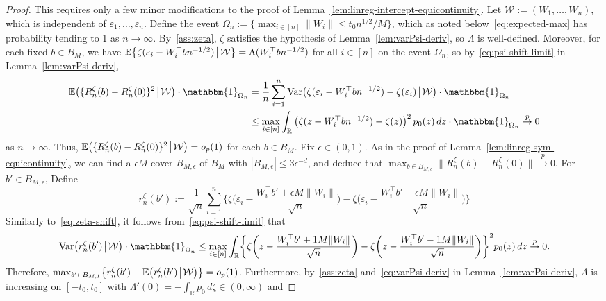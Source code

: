 \documentclass[a4paper]{article}
\newcommand{\R}{\mathbb{R}}
\newcommand{\E}{\mathbb{E}}
\newcommand{\Ind}{\mathbbm{1}}
\newcommand{\norm}[1]{\|{#1}\|}
\newcommand{\cvp}{\overset{p}{\to}}
\DeclareMathOperator\Var{Var}
\theoremstyle{definition}
\begin{document}
\begin{proof}
This requires only a few minor modifications to the proof of Lemma~\ref{lem:linreg-intercept-equicontinuity}. Let $\mathcal{W} := (W_1,\dotsc,W_n)$, which is independent of $\varepsilon_1,\dotsc,\varepsilon_n$. Define the event $\Omega_n := \{\max_{i \in [n]}\norm{W_i} \leq t_0 n^{1/2}/M\}$, which as noted below~\eqref{eq:expected-max} has probability tending to 1 as $n \to \infty$. By~\ref{ass:zeta}, $\zeta$ satisfies the hypothesis of Lemma~\ref{lem:varPsi-deriv}, so $\Lambda$ is well-defined. Moreover, for each fixed $b \in B_M$, we have $\E\bigl\{\zeta(\varepsilon_i - W_i^\top bn^{-1/2})\!\bigm|\!\mathcal{W}\bigr\} = \Lambda(W_i^\top bn^{-1/2})$ for all $i \in [n]$ on the event $\Omega_n$, so by~\eqref{eq:psi-shift-limit} in Lemma~\ref{lem:varPsi-deriv},
\begin{align}
\E\bigl(\{R_n^\zeta(b) - R_n^\zeta(0)\}^2\!\bigm|\!\mathcal{W}\bigr) \cdot \Ind_{\Omega_n} &= \frac{1}{n}\sum_{i=1}^n \Var\bigl(\zeta(\varepsilon_i - W_i^\top bn^{-1/2}) - \zeta(\varepsilon_i)\!\bigm|\!\mathcal{W}\bigr) \cdot \Ind_{\Omega_n} \notag \\
\label{eq:zeta-shift}
&\leq \max_{i \in [n]}\int_\R\,\bigl(\zeta(z - W_i^\top bn^{-1/2}) - \zeta(z)\bigr)^2\,p_0(z)\,dz \cdot \Ind_{\Omega_n} \cvp 0
\end{align}
as $n \to \infty$. Thus, $\E\bigl(\{R_n^\zeta(b) - R_n^\zeta(0)\}^2\!\bigm|\!\mathcal{W}\bigr) = o_p(1)$ for each $b \in B_M$. Fix $\epsilon \in (0,1)$. As in the proof of Lemma~\ref{lem:linreg-sym-equicontinuity}, we can find a $\epsilon M$-cover $B_{M,\epsilon}$ of $B_M$ with $|B_{M,\epsilon}| \leq 3\epsilon^{-d}$, and deduce that $\max_{b \in B_{M,\epsilon}} \norm{R_n^\zeta(b) - R_n^\zeta(0)} \cvp 0$. For $b' \in B_{M,\epsilon}$, Define
\[
r_n^\zeta(b') := \frac{1}{\sqrt{n}} \sum_{i=1}^n \biggl\{\zeta\biggl(\varepsilon_i - \frac{W_i^\top b' + \epsilon M\norm{W_i}}{\sqrt{n}}\biggr) - \zeta\biggl(\varepsilon_i - \frac{W_i^\top b' - \epsilon M\norm{W_i}}{\sqrt{n}}\biggr)\biggr\}
\]
Similarly to~\eqref{eq:zeta-shift}, it follows from~\eqref{eq:psi-shift-limit} that
\begin{align*}
\Var\bigl(r_n^\zeta(b')\!\bigm|\!\mathcal{W}\bigr) \cdot \Ind_{\Omega_n} \leq \max_{i \in [n]} \int_\R\biggl\{\zeta\biggl(z - \frac{W_i^\top b' + \epsilon M\norm{W_i}}{\sqrt{n}}\biggr) - \zeta\biggl(z - \frac{W_i^\top b' - \epsilon M\norm{W_i}}{\sqrt{n}}\biggr)\biggr\}^2 p_0(z)\,dz \cvp 0.
\end{align*}
Therefore, $\max_{b' \in B_{M,\epsilon}} \bigl\{r_n^\zeta(b') - \E\bigl(r_n^\zeta(b')\!\bigm|\!\mathcal{W}\bigr)\bigr\} = o_p(1)$. Furthermore, by~\ref{ass:zeta} and~\eqref{eq:varPsi-deriv} in Lemma~\ref{lem:varPsi-deriv}, $\Lambda$ is increasing on $[-t_0,t_0]$ with $\Lambda'(0) = -\int_\R p_0\,d\zeta \in (0,\infty)$ and

\end{proof}
\end{document}
